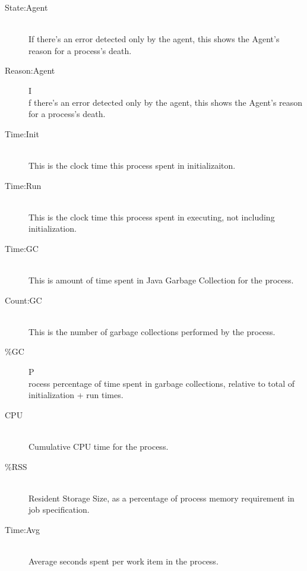 \begin{description}
          \item[State:Agent] \hfill \\
            If there's an error detected only by the agent, this shows the Agent's reason for
            a process's death.

          \item[Reason:Agent]I\hfill \\
            f there's an error detected only by the agent, this shows the Agent's reason for
            a process's death.
            
          \item[Time:Init] \hfill \\
            This is the clock time this process spent in initializaiton.
            
          \item[Time:Run] \hfill \\
            This is the clock time this process spent in executing, not including
            initialization.
            
          \item[Time:GC] \hfill \\
            This is amount of time spent in Java Garbage Collection for the process.
            
          \item[Count:GC] \hfill \\
            This is the number of garbage collections performed by the process.
            
          \item[\%GC]P\hfill \\
            rocess percentage of time spent in garbage collections, relative to total of
            initialization + run times.
            
          \item[CPU] \hfill \\
            Cumulative CPU time for the process.
            
          \item[\%RSS] \hfill \\
            Resident Storage Size, as a percentage of process memory requirement in job
            specification.
            
          \item[Time:Avg] \hfill \\
            Average seconds spent per work item in the process.
            

\end{description}

